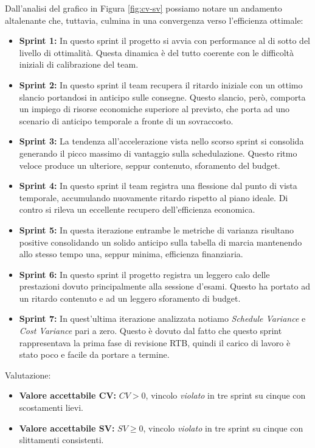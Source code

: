 \documentclass[a4paper, 10pt, colorlinks=true, linkcolor=black, urlcolor=blue, citecolor=blue, hidelinks]{article}
\begin{document}
Dall'analisi del grafico in Figura \ref{fig:cv-sv} possiamo notare un andamento altalenante che, tuttavia, culmina in una convergenza verso l'efficienza ottimale:
\begin{itemize}
    \item \textbf{Sprint 1:} In questo sprint il progetto si avvia con performance al di sotto del livello di ottimalità. Questa dinamica è del tutto coerente con le difficoltà iniziali di calibrazione del team.
    \item \textbf{Sprint 2:} In questo sprint il team recupera il ritardo iniziale con un ottimo slancio portandosi in anticipo sulle consegne. Questo slancio, però, comporta un impiego di risorse economiche superiore al previsto, che porta ad uno scenario di anticipo temporale a fronte di un sovraccosto.
    \item \textbf{Sprint 3:} La tendenza all'accelerazione vista nello scorso sprint si consolida generando il picco massimo di vantaggio sulla schedulazione. Questo ritmo veloce produce un ulteriore, seppur contenuto, sforamento del budget.
    \item \textbf{Sprint 4:} In questo sprint il team registra una flessione dal punto di vista temporale, accumulando nuovamente ritardo rispetto al piano ideale. Di contro si rileva un eccellente recupero dell'efficienza economica.
    \item \textbf{Sprint 5:} In questa iterazione entrambe le metriche di varianza risultano positive consolidando un solido anticipo sulla tabella di marcia mantenendo allo stesso tempo una, seppur minima, efficienza finanziaria.
    \item \textbf{Sprint 6:} In questo sprint il progetto registra un leggero calo delle prestazioni dovuto principalmente alla sessione d'esami. Questo ha portato ad un ritardo contenuto e ad un leggero sforamento di budget.
    \item \textbf{Sprint 7:} In quest'ultima iterazione analizzata notiamo \textit{Schedule Variance} e \textit{Cost Variance} pari a zero. Questo è dovuto dal fatto che questo sprint rappresentava la prima fase di revisione RTB, quindi il carico di lavoro è stato poco e facile da portare a termine. 
\end{itemize}
Valutazione: 
\begin{itemize}
    \item \textbf{Valore accettabile CV:} $CV>0$, vincolo \textit{violato} in tre sprint su cinque con scostamenti lievi.
    \item \textbf{Valore accettabile SV:} $SV\geq 0$, vincolo \textit{violato} in tre sprint su cinque con slittamenti consistenti.
\end{itemize}
\end{document}
